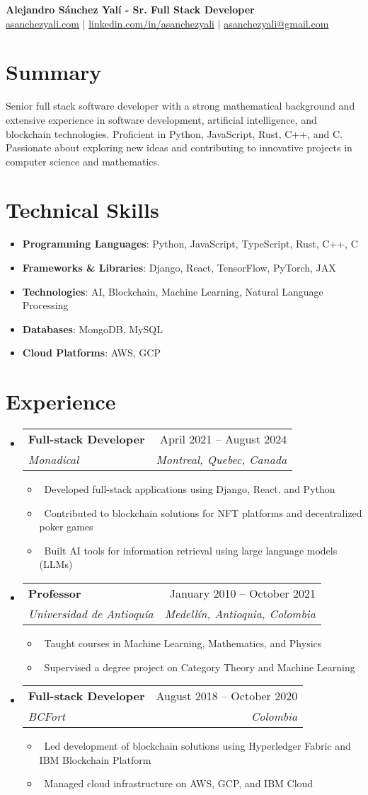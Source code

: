 \documentclass[letterpaper,10pt]{article}
\makeatletter
\newcommand{\resumeItem}[1]{\item\small{#1}}
\newcommand{\resumeSubheading}[4]{
\vspace{-1pt}\item
  \begin{tabular*}{0.97\textwidth}[t]{l@{\extracolsep{\fill}}r}
    \textbf{#1} & #2 \\
    \textit{#3} & \textit{#4} \\
  \end{tabular*}\vspace{-7pt}
}
\newcommand{\resumeSubHeadingList}{\begin{itemize}[leftmargin=0.15in, label={}]}
\newcommand{\resumeSubHeadingListEnd}{\end{itemize}}
\makeatother
\begin{document}
\begin{center}
  \textbf{\huge Alejandro Sánchez Yalí - Sr. Full Stack Developer} \\
  \href{https://asanchezyali.com}{asanchezyali.com} $|$ 
  \href{https://www.linkedin.com/in/asanchezyali}{linkedin.com/in/asanchezyali} $|$
  \small \href{mailto:asanchezyali@gmail.com}{asanchezyali@gmail.com} 
\end{center}

\section*{Summary}
Senior full stack software developer with a strong mathematical background and extensive experience in software development, artificial intelligence, and blockchain technologies. Proficient in Python, JavaScript, Rust, C++, and C. Passionate about exploring new ideas and contributing to innovative projects in computer science and mathematics.

\section{Technical Skills}
\resumeSubHeadingList
  \resumeItem{\textbf{Programming Languages}: Python, JavaScript, TypeScript, Rust, C++, C}
  \resumeItem{\textbf{Frameworks \& Libraries}: Django, React, TensorFlow, PyTorch, JAX}
  \resumeItem{\textbf{Technologies}: AI, Blockchain, Machine Learning, Natural Language Processing}
  \resumeItem{\textbf{Databases}: MongoDB, MySQL}
  \resumeItem{\textbf{Cloud Platforms}: AWS, GCP}
\resumeSubHeadingListEnd

\section{Experience}
\resumeSubHeadingList
  \resumeSubheading
      {Full-stack Developer}{April 2021 -- August 2024}
      {Monadical}{Montreal, Quebec, Canada}
      \resumeSubHeadingList
          \resumeItem{\textbullet\ Developed full-stack applications using Django, React, and Python}
          \resumeItem{\textbullet\ Contributed to blockchain solutions for NFT platforms and decentralized poker games}
          \resumeItem{\textbullet\ Built AI tools for information retrieval using large language models (LLMs)}
      \resumeSubHeadingListEnd
  \resumeSubheading
      {Professor}{January 2010 -- October 2021}
      {Universidad de Antioquía}{Medellín, Antioquia, Colombia}
      \resumeSubHeadingList
          \resumeItem{\textbullet\ Taught courses in Machine Learning, Mathematics, and Physics}
          \resumeItem{\textbullet\ Supervised a degree project on Category Theory and Machine Learning}
      \resumeSubHeadingListEnd
  \resumeSubheading
      {Full-stack Developer}{August 2018 -- October 2020}
      {BCFort}{Colombia}
      \resumeSubHeadingList
          \resumeItem{\textbullet\ Led development of blockchain solutions using Hyperledger Fabric and IBM Blockchain Platform}
          \resumeItem{\textbullet\ Managed cloud infrastructure on AWS, GCP, and IBM Cloud}
      \resumeSubHeadingListEnd
\resumeSubHeadingListEnd
\end{document}
